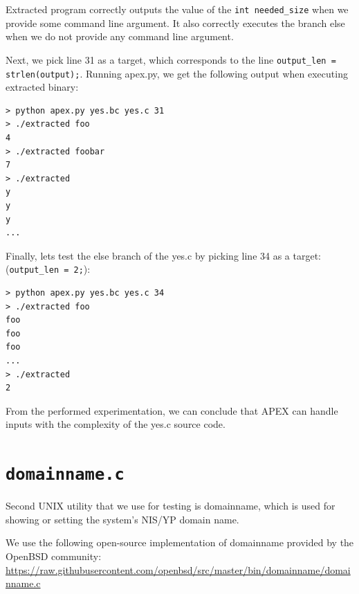 \documentclass[12pt, twoside]{fithesis2}
\renewcommand{\_}{\leavevmode \kern0.07em\vbox{\hrule width0.4em}}
\begin{document}
Extracted program correctly outputs the value of the
\texttt{int needed_size} when we provide some command line argument.
It also correctly executes the branch else when we do not provide any command
line argument.

Next, we pick line 31 as a target, which corresponds to the line
\texttt{output_len = strlen(output);}.
Running apex.py, we get the following output when executing extracted binary:

\begin{verbatim}
> python apex.py yes.bc yes.c 31
> ./extracted foo
4
> ./extracted foobar
7
> ./extracted
y
y
y
...
\end{verbatim}

Finally, lets test the else branch of the yes.c by picking line 34 as a target:
(\texttt{output_len = 2;}):

\begin{verbatim}
> python apex.py yes.bc yes.c 34
> ./extracted foo
foo
foo
foo
...
> ./extracted
2
\end{verbatim}

From the performed experimentation, we can conclude that APEX can handle inputs
with the complexity of the yes.c source code.

\section{\texttt{domainname.c}}
\label{sec:exp_domainname}

Second UNIX utility that we use for testing is domainname, which is used
for showing or setting the system's NIS/YP domain name.

We use the following open-source implementation of domainname provided by the
OpenBSD community:
\url{https://raw.githubusercontent.com/openbsd/src/master/bin/domainname/domainname.c}
\end{document}
